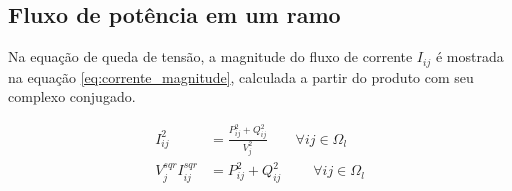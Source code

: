 \subsection{Fluxo de potência em um ramo}

Na equação de queda de tensão, a magnitude do fluxo de corrente $I_{ij}$ é mostrada na equação \eqref{eq:corrente_magnitude}, calculada a partir do produto com seu complexo conjugado.

\begin{equation}
    \begin{split}
        I_{ij}^{2} &= \frac{P_{ij}^{2}+Q_{ij}^{2}}{V_{j}^{2}}\qquad\forall ij \in \Omega_{l}\\
        V_{j}^{sqr}I_{ij}^{sqr} &= P_{ij}^{2}+Q_{ij}^{2}\;\qquad\forall ij \in \Omega_{l}
    \end{split}
    \label{eq:corrente_magnitude}
\end{equation}
